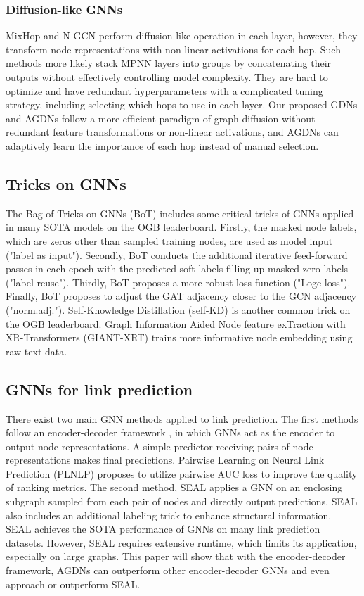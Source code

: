 \documentclass{article}
\begin{document}
\subsubsection{Diffusion-like GNNs}

MixHop \cite{abu2019mixhop} and N-GCN \cite{abu2020n} perform diffusion-like operation in each layer, however, they transform node representations with non-linear activations for each hop. Such methods more likely stack MPNN layers into groups by concatenating their outputs without effectively controlling model complexity. They are hard to optimize and have redundant hyperparameters with a complicated tuning strategy, including selecting which hops to use in each layer. Our proposed GDNs and AGDNs follow a more efficient paradigm of graph diffusion without redundant feature transformations or non-linear activations, and AGDNs can adaptively learn the importance of each hop instead of manual selection.

\subsection{Tricks on GNNs}
The Bag of Tricks on GNNs (BoT)\cite{wang2021bag} includes some critical tricks of GNNs applied in many SOTA models on the OGB leaderboard. Firstly, the masked node labels, which are zeros other than sampled training nodes, are used as model input ("label as input"). Secondly, BoT conducts the additional iterative feed-forward passes in each epoch with the predicted soft labels filling up masked zero labels ("label reuse"). Thirdly, BoT proposes a more robust loss function ("Loge loss"). Finally, BoT proposes to adjust the GAT adjacency closer to the GCN adjacency ("norm.adj."). Self-Knowledge Distillation (self-KD) \cite{zhang2019your} is another common trick on the OGB leaderboard. Graph Information Aided Node feature exTraction with XR-Transformers (GIANT-XRT) \cite{chien2021node} trains more informative node embedding using raw text data.

\subsection{GNNs for link prediction}
There exist two main GNN methods applied to link prediction. The first methods follow an encoder-decoder framework \cite{kipf2016variational, hu2020open}, in which GNNs act as the encoder to output node representations. A simple predictor receiving pairs of node representations makes final predictions. Pairwise Learning on Neural Link Prediction (PLNLP) proposes to utilize pairwise AUC loss to improve the quality of ranking metrics. The second method, SEAL \cite{zhang2021labeling, zhang2018link} applies a GNN on an enclosing subgraph sampled from each pair of nodes and directly output predictions. SEAL also includes an additional labeling trick to enhance structural information. SEAL achieves the SOTA performance of GNNs on many link prediction datasets. However, SEAL requires extensive runtime, which limits its application, especially on large graphs. This paper will show that with the encoder-decoder framework, AGDNs can outperform other encoder-decoder GNNs and even approach or outperform SEAL.
\end{document}
